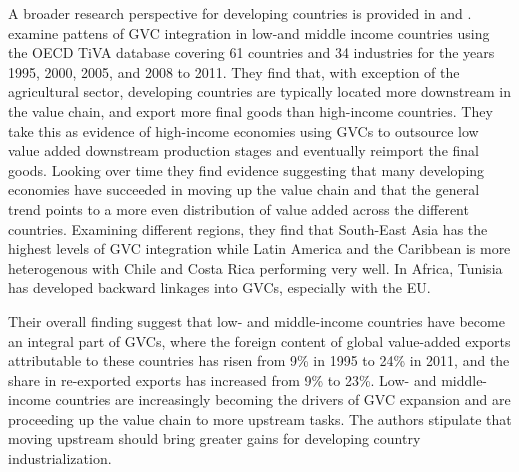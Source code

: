 \documentclass[a4paper]{article}
\begin{document}
A broader research perspective for developing countries is provided in \citet{Kummritz20162} and \citet{Kummritz20161}. \citet{Kummritz20162} examine pattens of GVC integration in low-and middle income countries using the OECD TiVA database covering 61 countries and 34 industries for the years 1995, 2000, 2005, and 2008 to 2011. They find that, with exception of the agricultural sector, developing countries are typically located more downstream in the value chain, and export more final goods than high-income countries. They take this as evidence of high-income economies using GVCs to outsource low value added downstream production stages and eventually reimport the final goods. Looking over time they find evidence suggesting that many developing economies have succeeded in moving up the value chain and that the general trend points to a more even distribution of value added across the different countries. Examining different regions, they find that South-East Asia has the highest levels of GVC integration while Latin America and the Caribbean is more heterogenous with Chile and Costa Rica performing very well. In Africa, Tunisia has developed backward linkages into GVCs, especially with the EU. \newline 

Their overall finding suggest that low- and middle-income countries have become an integral part of GVCs, where the foreign content of global value-added exports attributable to these countries has risen from 9\% in 1995 to 24\% in 2011, and the share in re-exported exports has increased from 9\% to 23\%. Low- and middle-income countries are increasingly becoming the drivers of GVC expansion and are proceeding up the value chain to more upstream tasks. The authors stipulate that moving upstream should bring greater gains for developing country industrialization. \newline
\end{document}
